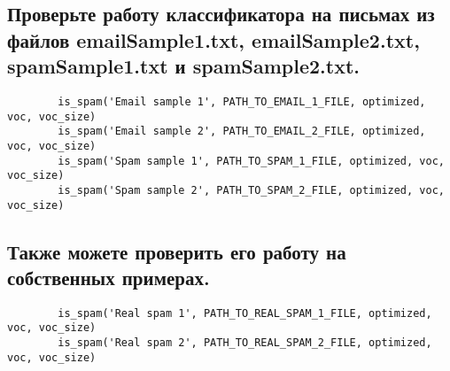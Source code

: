 \subsection{Проверьте работу классификатора на письмах из файлов emailSample1.txt, emailSample2.txt, spamSample1.txt и spamSample2.txt.}

\begin{lstlisting}
        is_spam('Email sample 1', PATH_TO_EMAIL_1_FILE, optimized, voc, voc_size)
        is_spam('Email sample 2', PATH_TO_EMAIL_2_FILE, optimized, voc, voc_size)
        is_spam('Spam sample 1', PATH_TO_SPAM_1_FILE, optimized, voc, voc_size)
        is_spam('Spam sample 2', PATH_TO_SPAM_2_FILE, optimized, voc, voc_size)
\end{lstlisting}

\subsection{Также можете проверить его работу на собственных примерах.}

\begin{lstlisting}
        is_spam('Real spam 1', PATH_TO_REAL_SPAM_1_FILE, optimized, voc, voc_size)
        is_spam('Real spam 2', PATH_TO_REAL_SPAM_2_FILE, optimized, voc, voc_size)
\end{lstlisting}



